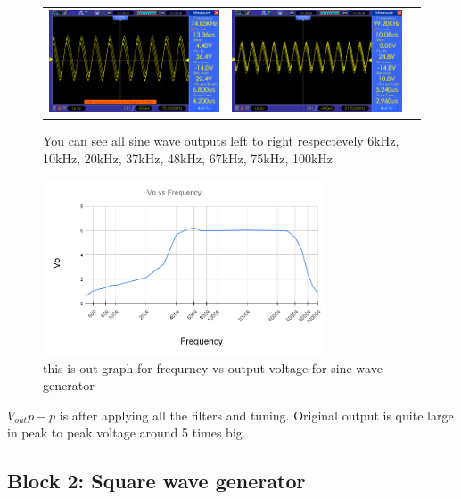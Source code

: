 \documentclass[14pt,a4paper]{extarticle}
\begin{document}
\begin{figure}[H]
\begin{tabular}{ccc}
    \includegraphics[width=.49\linewidth]{imgs/sine75k.png}&
    \includegraphics[width=.49\linewidth]{imgs/sine100k.png}
\end{tabular}
\vspace{0.2cm}
\caption{You can see all sine wave outputs left to right respectevely 6kHz, 10kHz, 20kHz, 37kHz, 48kHz, 67kHz, 75kHz, 100kHz}
\label{fig:filters}
\end{figure}

\begin{figure}
    \centering
    \includegraphics[width=0.75\textwidth]{imgs/sinegraph.png}
    \caption{this is out graph for frequrncy vs output voltage for sine wave generator}
    \label{fig:sinegraph}
\end{figure}

\(V_{out}{p-p}\) is after applying all the filters and tuning. Original output is quite large in peak to peak voltage around 5 times big.




\subsection{Block 2: Square wave generator}
\label{sec:org29641f3}
\end{document}
